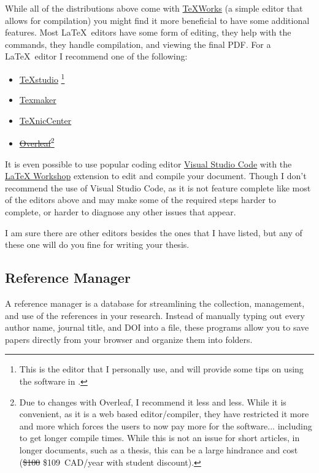 			While all of the distributions above come with \href{https://www.tug.org/texworks/}{TeXWorks} (a simple editor that allows for compilation) you might find it more beneficial to have some additional features.
			Most \LaTeX\ editors have some form of editing, they help with the commands, they handle compilation, and viewing the final PDF.
			For a \LaTeX\ editor I recommend one of the following:
			\begin{itemize}
				\item \href{https://www.texstudio.org/}{TeXstudio}%
					\footnote{This is the editor that I personally use, and will provide some tips on using the software in .}
				\item \href{http://www.xm1math.net/texmaker/}{Texmaker}
				\item \href{http://www.texniccenter.org/}{TeXnicCenter}
				\item \href{https://www.overleaf.com/}{\sout{Overleaf}}\footnote{Due to changes with Overleaf, I recommend it less and less. While it is convenient, as it is a web based editor/compiler, they have restricted it more and more which forces the users to now pay more for the software... including to get longer compile times. While this is not an issue for short articles, in longer documents, such as a thesis, this can be a large hindrance and cost (\sout{\$100} \$109~CAD/year with student discount).}
			\end{itemize}
			It is even possible to use popular coding editor \href{https://code.visualstudio.com/}{Visual Studio Code} with the \href{https://marketplace.visualstudio.com/items?itemName=James-Yu.latex-workshop}{LaTeX Workshop} extension to edit and compile your document.
			Though I don't recommend the use of Visual Studio Code, as it is not feature complete like most of the editors above and may make some of the required steps harder to complete, or harder to diagnose any other issues that appear.
			
			I am sure there are other editors besides the ones that I have listed, but any of these one will do you fine for writing your thesis.

		\subsection{Reference Manager}
			A reference manager is a database for streamlining the collection, management, and  use of the references in your research. 
			Instead of manually typing out every author name, journal title, and DOI into a  file, these programs allow you to save papers directly from your browser and organize them into folders.

